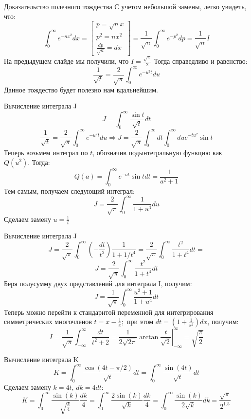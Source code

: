 \begin{frame}{Доказательство полезного тождества}
С учетом небольшой замены, легко увидеть, что:
$$
\int_{0}^{\infty} e^{-n x^{2}} d x=\left[\begin{array}{l}
p=\sqrt{n} x \\
p^{2}=n x^{2} \\
\frac{d p}{\sqrt{n}}=d x
\end{array}\right]=\frac{1}{\sqrt{n}} \int_{0}^{\infty} e^{-p^{2}} d p=\frac{1}{\sqrt{n}} I
$$
На предыдущем слайде мы получили, что $I = \frac{\sqrt{\pi}}{2}$ Тогда справедливо и равенство:
$$
\frac{1}{\sqrt{t}}=\frac{2}{\sqrt{\pi}} \int_{0}^{\infty} e^{-u^{2} t} d u
$$
Данное тождество будет полезно нам вдальнейшим.
\end{frame}
\begin{frame}{Вычисление интеграла J}
$$
J=\int_{0}^{\infty} \frac{\sin t}{\sqrt{t}} d t
$$
$$
\frac{1}{\sqrt{t}}=\frac{2}{\sqrt{\pi}} \int_{0}^{\infty} e^{-u^{2} t} d u \Rightarrow J=\frac{2}{\sqrt{\pi}} \int_{0}^{\infty} d t \int_{0}^{\infty} d u e^{-t u^{2}}\sin{t}
$$
Теперь возьмем интеграл по $t$, обозначив подынтегральную функцию как $Q\left(u^{2}\right) .$ Тогда:
$$
Q(a)=\int_{0}^{\infty} e^{-a t} \sin t d t=\frac{1}{a^{2}+1}
$$
Тем самым, получаем следующий интеграл:
$$J=\frac{2}{\sqrt{\pi}} \int_{0}^{\infty} \frac{1}{1+u^{4}} d u$$
Сделаем замену $u=\frac{1}{t}$
\end{frame}
\begin{frame}{Вычисление интеграла J}
$$
J=\frac{2}{\sqrt{\pi}} \int_{0}^{\infty}\left(-\frac{d t}{t^{2}}\right) \frac{1}{1+1 / t^{4}}=\frac{2}{\sqrt{\pi}} \int_{0}^{\infty} \frac{t^2}{1+t^{4}} d t=
$$
$$
J=\frac{2}{\sqrt{\pi}} \int_{0}^{\infty} \frac{t^2}{1+t^{4}} d t
$$
Беря полусумму двух представлений для интеграла I, получим:
$$
J=\frac{1}{\sqrt{\pi}} \int_{0}^{\infty} \frac{u^2+1}{1+u^{4}} d t
$$
Теперь можно перейти к стандарнтой переменной для интегрирования \\
симметрических многочленов $t=x-\frac{1}{x} ;$ при этом $d t=\left(1+\frac{1}{x^{2}}\right) d x$, получим:
$$
I=\frac{1}{\sqrt{\pi}} \int_{-\infty}^{\infty} \frac{d t}{t^{2}+2}=\left.\frac{1}{2 \sqrt{2 \pi}} \arctan \frac{t}{\sqrt{2}}\right|_{-\infty} ^{\infty}=\sqrt{\frac{\pi}{2}}
$$
\end{frame}

\begin{frame}{Вычисление интеграла K}
$$K=\int_{0}^{\infty} \frac{\cos (4 t-\pi / 2)}{\sqrt{t}} d t=\int_{0}^{\infty} \frac{\sin(4t)}{\sqrt{t}}dt$$
Сделаем замену $k=4t$, $dk=4dt$:
$$K=\int_{0}^{\infty} \frac{\sin(k)}{\sqrt{\frac{k}{4}}}\frac{dk}{4}=\int_{0}^{\infty} \frac{2\sin(k)}{\sqrt{k}}\frac{dk}{4}=\int_{0}^{\infty} \frac{\sin(k)}{2\sqrt{k}}dk=\frac{\sqrt{\pi}}{2^{1.5}}$$
\end{frame}

